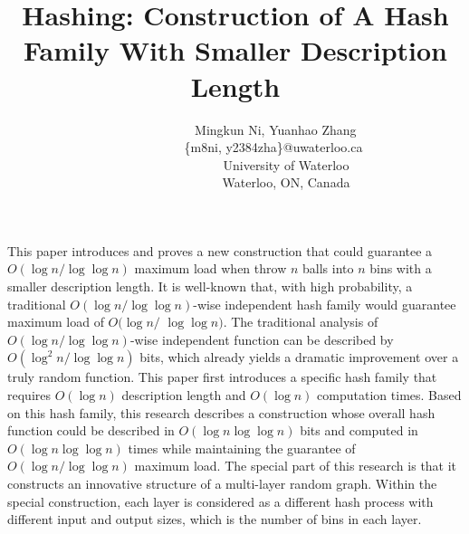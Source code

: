 \documentclass[a4paper, english]{paper}
\renewenvironment{abstract}
 {
  \begin{center}
  \bfseries \abstractname\vspace{-.5em}\vspace{0pt}
  \end{center}
  \list{}{
    \setlength{\leftmargin}{1cm}%
    \setlength{\rightmargin}{\leftmargin}%
  }%
  \item\relax}
 {\endlist}
\begin{document}
\selectfont

	\title{Hashing: Construction of A Hash Family With Smaller Description Length}
	\author{$\qquad$$\qquad$$\qquad$ Mingkun Ni, Yuanhao Zhang\\
		$\qquad$$\qquad$$\qquad$\{m8ni, y2384zha\}@uwaterloo.ca\\
		 $\qquad$$\qquad$$\qquad$$\qquad$University of Waterloo\\
		$\qquad$$\qquad$$\qquad$$\qquad$Waterloo, ON, Canada\\
	}
	\maketitle
	
	\vspace{0.3cm}
	\begin{abstract}
	This paper introduces and proves a new construction that could guarantee a $O(\log n/\log\log n)$ maximum load when throw $n$ balls into $n$ bins with a smaller description length. It is well-known that, with high probability, a traditional $O(\log n/\log\log n)$-wise independent hash family would guarantee maximum load of $O(\log n/$ $\log\log n)$. The traditional analysis of $O(\log n/\log\log n)$-wise independent function can be described by $O(\log^2 n/\log\log n)$ bits, which already yields a dramatic improvement over a truly random function. This paper first introduces a specific hash family that requires $O(\log n)$ description length and $O(\log n)$ computation times. Based on this hash family, this research describes a construction whose overall hash function could be described in $O(\log n \log\log n)$ bits and computed in $O(\log n \log\log n)$ times while maintaining the guarantee of $O(\log n/\log\log n)$ maximum load. The special part of this research is that it constructs an innovative structure of a multi-layer random graph. Within the special construction, each layer is considered as a different hash process with different input and output sizes, which is the number of bins in each layer.
	\end{abstract}
	\vspace{0.3cm}
\end{document}
